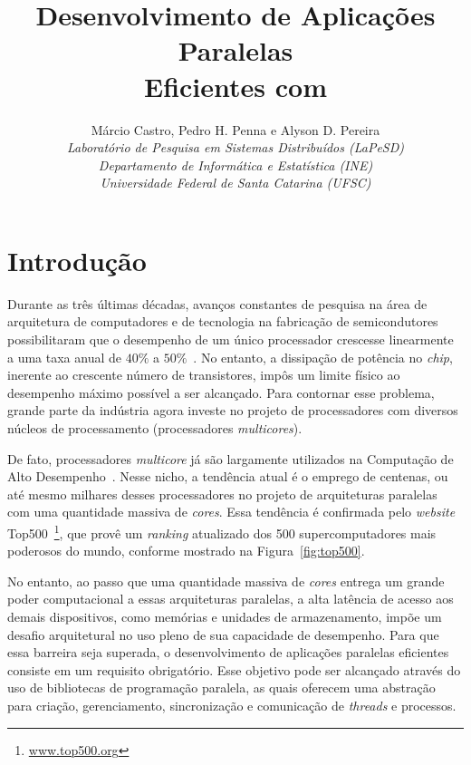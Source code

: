 \documentclass{SBCbookchapter}
\author{%
	Márcio Castro, Pedro H. Penna e Alyson D. Pereira                  \\
	\textit{Laboratório de Pesquisa em Sistemas Distribuídos (LaPeSD)} \\
	\textit{Departamento de Informática e Estatística (INE)}           \\
	\textit{Universidade Federal de Santa Catarina (UFSC)}
}
\title{Desenvolvimento de Aplicações Paralelas\\Eficientes com \openmp}
\begin{document}
\maketitle

\begin{resumo}
	\lipsum[1]
\end{resumo}

\section{Introdução}

	Durante as três últimas décadas, avanços constantes de pesquisa na
	área de arquitetura de computadores e de tecnologia na fabricação de
	semicondutores possibilitaram que o desempenho de um único
	processador crescesse linearmente a uma taxa anual de $40\%$ a
	$50\%$~\cite{LARUS08}. No entanto, a dissipação de potência no
	\textit{chip}, inerente ao crescente número de transistores, impôs
	um limite físico ao desempenho máximo possível a ser alcançado.
	Para contornar esse problema, grande parte da indústria agora
	investe no projeto de processadores com diversos núcleos de
	processamento (processadores \textit{multicores}).

	De fato, processadores \textit{multicore} já são largamente
	utilizados na Computação de Alto Desempenho~\cite{Asanovic09}.
	Nesse nicho, a tendência atual é o emprego de centenas, ou até mesmo
	milhares desses processadores no projeto de arquiteturas paralelas
	com uma quantidade massiva de \textit{cores}. Essa tendência é
	confirmada pelo \textit{website}
	Top500~\footnote{\url{www.top500.org}}, que provê um
	\textit{ranking} atualizado	dos 500 supercomputadores mais poderosos
	do mundo, conforme mostrado na Figura~\ref{fig:top500}.
		
	No entanto, ao passo que uma quantidade massiva de \textit{cores}
	entrega um grande poder computacional a essas arquiteturas
	paralelas, a alta latência de acesso aos demais dispositivos, como
	memórias e unidades de armazenamento, impõe um desafio arquitetural
	no uso pleno de sua capacidade de desempenho. Para que essa
	barreira seja superada, o desenvolvimento de aplicações paralelas
	eficientes consiste em um requisito obrigatório. Esse objetivo pode
	ser alcançado através do uso de bibliotecas de programação paralela,
	as quais oferecem uma abstração para criação, gerenciamento, sincronização
	e comunicação de \textit{threads} e processos.
\end{document}

